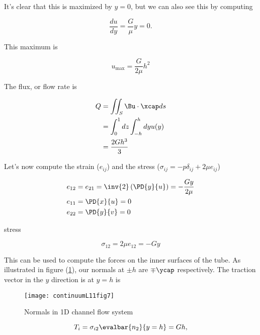 It's clear that this is maximized by $y = 0$, but we can also see this by computing

\begin{equation}\label{eqn:continuumL11:710}
\frac{du}{dy} = \frac{G}{\mu} y = 0.
\end{equation}

This maximum is

\begin{equation}\label{eqn:continuumL11:850}
u_{\text{max}} = \frac{G}{2\mu} h^2
\end{equation}

The flux, or flow rate is

\begin{align*}
Q 
&= \iint_S \Bu \cdot \xcap ds \\
&= \int_0^1 dz \int_{-h}^h dy u(y) \\
&=
\frac{2 G h^3}{3}
\end{align*}

Let's now compute the strain ($e_{ij}$) and the stress ($\sigma_{ij} = -p \delta_{ij} + 2 \mu e_{ij}$)

\begin{align}\label{eqn:continuumL11:730}
e_{12} &= e_{21} = \inv{2} \left( \PD{y}{u} \right) = - \frac{G y}{2 \mu} \\
e_{11} &= \PD{x}{u} = 0 \\
e_{22} &= \PD{y}{v} = 0
\end{align}

stress

\begin{equation}\label{eqn:continuumL11:750}
\sigma_{12} = 2 \mu e_{12} = -G y
\end{equation}

This can be used to compute the forces on the inner surfaces of the tube.  As illustrated in figure (\ref{fig:continuumL11:continuumL11fig7}), our normals at $\pm h$ are $\mp \ycap$ respectively.  The traction vector in the $y$ direction is at $y = h$ is

\begin{figure}[htp]
   \centering
   \texttt{[image: continuumL11fig7]}
   \caption{Normals in 1D channel flow system}\label{fig:continuumL11:continuumL11fig7}
\end{figure}

\begin{equation}\label{eqn:continuumL11:770}
T_i = \sigma_{i 2} \evalbar{n_2}{y = h} = G h,
\end{equation}

